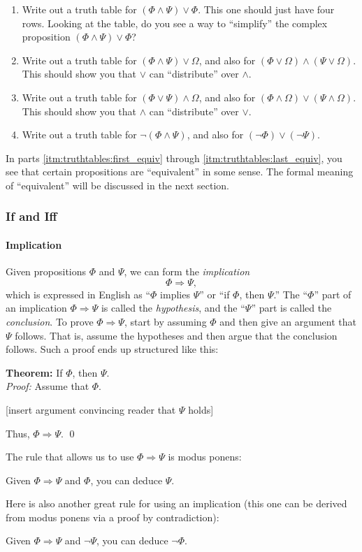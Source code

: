 \documentclass[12pt]{article}
\newcommand{\AND}{\wedge}
\newcommand{\OR}{\vee}
\newcommand{\ARR}{\Rightarrow}
\newcounter{rule}
\def\putRuleNumber{\refstepcounter{rule}\therule}
\newcommand{\indented}[1]{\begin{adjustwidth}{1em}{}#1\end{adjustwidth}}
\newcommand{\THM}[2]{\textbf{Theorem:} #1\\[0.5em]\textit{Proof:} #2\qed}
\newcommand{\RULE}[2]{\begin{tcolorbox}[title=Rule \putRuleNumber: #1,colbacktitle=white,coltitle=black,colback=white]#2\end{tcolorbox}}
\newcommand{\DRULE}[2]{\begin{tcolorbox}[title=Derived Rule \putRuleNumber: #1,colbacktitle=white,coltitle=black,colback=white]#2\end{tcolorbox}} %
\def\pA{\Phi}
\def\pB{\Psi}
\def\pC{\Omega}
\begin{document}
{\begin{enumerate}
\item
Write out a truth table for $(\pA\AND\pB)\OR\pA$. This one should just have four rows.
Looking at the table, do you see a way to ``simplify'' the complex proposition  $(\pA\AND\pB)\OR\pA$?

\item
Write out a truth table for $(\pA\AND\pB)\OR\pC$, and also for $(\pA\OR\pC)\AND(\pB\OR\pC)$.
This should show you that $\OR$ can ``distribute'' over $\AND$.

\item
Write out a truth table for $(\pA\OR\pB)\AND\pC$, and also for $(\pA\AND\pC)\OR(\pB\AND\pC)$.
This should show you that $\AND$ can ``distribute'' over $\OR$.

\item \label{itm:truthtables:last_equiv}
Write out a truth table for $\neg(\pA\AND\pB)$, and also for $(\neg\pA)\OR(\neg\pB)$.
\end{enumerate}
In parts \ref{itm:truthtables:first_equiv} through \ref{itm:truthtables:last_equiv},
you see that certain propositions are ``equivalent'' in some sense. The formal meaning of ``equivalent'' will be
discussed in the next section.
}


\subsubsection{If and Iff}

\paragraph{Implication}
Given propositions $\pA$ and $\pB$, we can form the \emph{implication}
$$
\pA\ARR\pB,
$$
which is expressed in English as ``$\pA$ implies $\pB$'' or ``if $\pA$, then $\pB$.''
The ``$\pA$'' part of an implication $\pA\ARR\pB$ is called the \emph{hypothesis},
and the ``$\pB$'' part is called the \emph{conclusion}.
To prove $\pA\ARR\pB$,
start by assuming $\pA$ and
then give an argument that $\pB$ follows.
That is, assume the hypotheses and then argue that the conclusion follows.
Such a proof ends up structured like this:

\THM{If $\pA$, then $\pB$.}{
Assume that $\pA$.
\indented{[insert argument convincing reader that $\pB$ holds]}
Thus, $\pA\ARR\pB$.
}

The rule that allows us to use $\pA\ARR\pB$ is modus ponens:
\RULE{Modus ponens}{
Given $\pA\ARR\pB$ and $\pA$, you can deduce $\pB$.
}
Here is also another great rule for using an implication (this one can be derived from modus ponens via a proof by contradiction):
\DRULE{Modus tollens}{
Given $\pA\ARR\pB$ and $\neg\pB$, you can deduce $\neg\pA$.
}
\end{document}
